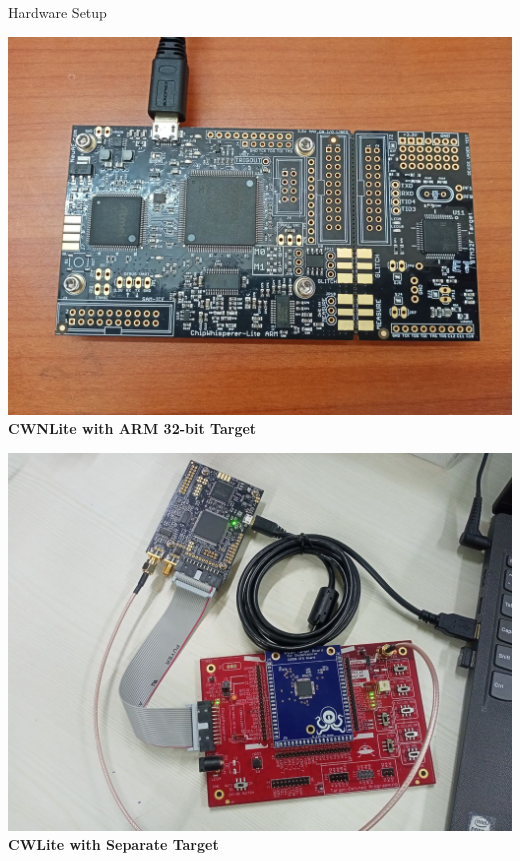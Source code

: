 \documentclass{beamer}
\newenvironment{tres important}[2][]{
	\setkeys{EmphEqEnv}{#2}
	\setkeys{EmphEqOpt}{box={\setlength{\fboxsep}{10pt}\fcolorbox{myNewColorA}{white}},#1}
	\EmphEqMainEnv}
{\endEmphEqMainEnv}
\begin{document}
\begin{frame}{Hardware Setup}
  \centering
  \begin{minipage}[b]{0.3\linewidth}
    \centering
    \includegraphics[width=\linewidth]{images/cwlite_background.JPEG}
    \smallskip
    \textbf{CWNLite with ARM 32-bit Target}
  \end{minipage}
  \hfill
  \begin{minipage}[b]{0.3\linewidth}
    \centering
    \includegraphics[width=\linewidth]{images/cwlite_separated_background.JPEG}
    \smallskip
    \textbf{CWLite with Separate Target}
  \end{minipage}
  \hfill
  \begin{minipage}[b]{0.3\linewidth}

\end{minipage}
\end{frame}
\end{document}
